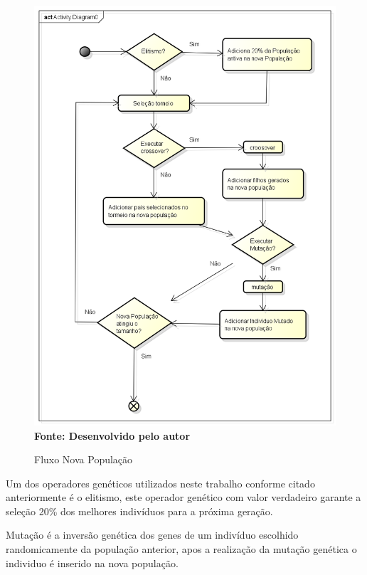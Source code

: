 \begin{figure}[!htb]
\caption[Fluxo Nova População]{Fluxo Nova População}
\label{fig:figura8}
\centering
\includegraphics[scale=0.5]{imagens/fluxoNovaPopulacao.png}
\\ \textbf{\footnotesize Fonte: Desenvolvido pelo autor}
\end{figure}


Um dos operadores genéticos utilizados neste trabalho conforme citado anteriormente é o elitismo, este operador genético com valor verdadeiro garante a seleção 20\% dos melhores indivíduos para a próxima geração.\par

Mutação é a inversão genética dos genes de um indivíduo escolhido randomicamente da população anterior, apos a realização da mutação genética o individuo é inserido na nova população.\par

